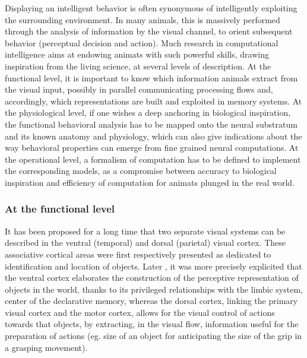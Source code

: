 Displaying an intelligent behavior is often synonymous of
intelligently exploiting the surrounding environment. In many animals,
this is massively performed through the analysis of information by the
visual channel, to orient subsequent behavior (perceptual decision and
action). Much research in computational intelligence aims at endowing
animats with such powerful skills, drawing inspiration from the living
science, at several levels of description. At the functional level, it
is important to know which information animals extract from the visual
input, possibly in parallel communicating processing flows and,
accordingly, which representations are built and exploited in memory
systems. At the physiological level, if one wishes a deep anchoring in
biological inspiration, the functional behavioral analysis has to be
mapped onto the neural substratum and its known anatomy and
physiology, which can also give indications about the way behavioral
properties can emerge from fine grained neural computations. At the
operational level, a formalism of computation has to be defined to
implement the corresponding models, as a compromise between accuracy
to biological inspiration and efficiency of computation for animats
plunged in the real world.

\subsubsection{At the functional level}

It has been proposed for a long time \cite{Ungerleider:1982} that two
separate visual systems can be described in the ventral (temporal) and
dorsal (parietal) visual cortex. These associative cortical areas
were first respectively presented as dedicated to identification and
location of objects. Later \cite{Milner:1995}, it was more precisely
explicited that the ventral cortex elaborates the construction of the
perceptive representation of objects in the world, thanks to its
privileged relationships with the limbic system, center of the
declarative memory, whereas the dorsal cortex, linking the primary
visual cortex and the motor cortex, allows for the visual control of
actions towards that objects, by extracting, in the visual flow,
information useful for the preparation of actions (eg. size of an
object for anticipating the size of the grip in a grasping movement). 

